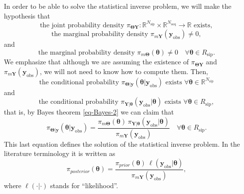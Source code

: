In order to be able to solve the statistical inverse problem, we will make the hypothesis that
\begin{equation}\label{eq-hyp-jpd}
\text{the joint probability density }\pi_{\boldsymbol{\Theta}\mathbf{Y}}:\mathbb{R}^{N_{\text{sip}}}\times\mathbb{R}^{N_{\text{soq}}}\rightarrow\mathbb{R}\text{ exists},
\end{equation}
\begin{equation}\label{eq-hyp-obs-mp}
\text{the marginal probability density }\pi_{m\mathbf{Y}}(\mathbf{y}_{\text{obs}})\neq 0,
\end{equation}
and
\begin{equation}\label{eq-hyp-theta-mp}
\text{the marginal probability density }\pi_{m\boldsymbol{\Theta}}(\boldsymbol{\theta})\neq 0\quad\forall\boldsymbol\theta\in R_{\text{sip}}.
\end{equation}
We emphasize that although we are assuming the existence of
$\pi_{\boldsymbol{\Theta}\mathbf{Y}}$ and
$\pi_{m\mathbf{Y}}(\mathbf{y}_{\text{obs}})$,
we will not need to know how to compute them.
Then,
\begin{equation*}
\text{the conditional probability }\pi_{\boldsymbol\Theta|\mathbf{y}}(\boldsymbol\theta|\mathbf{y}_{\text{obs}})\text{ exists }\forall\boldsymbol\theta\in\mathbb{R}^{N_{\text{sip}}}
\end{equation*}
and
\begin{equation*}
\text{the conditional probability }\pi_{\mathbf{Y}|\boldsymbol\theta}(\mathbf{y}_{\text{obs}}|\boldsymbol\theta)\text{ exists }\forall\boldsymbol\theta\in R_{\text{sip}},
\end{equation*}
that is, by Bayes theorem \eqref{eq-Bayes-2} we can claim that
\begin{equation*}
\pi_{\boldsymbol\Theta|\mathbf{y}}(\boldsymbol\theta|\mathbf{y}_{\text{obs}})
=
\frac
{\pi_{m\boldsymbol{\Theta}}(\boldsymbol{\theta})~\pi_{\mathbf{Y}|\boldsymbol\theta}(\mathbf{y}_{\text{obs}}|\boldsymbol\theta)}
{\pi_{m\mathbf{Y}}(\mathbf{y}_{\text{obs}})}
\quad\forall\boldsymbol\theta\in R_{\text{sip}}.
\end{equation*}
This last equation defines the solution of the statistical inverse problem. In the literature terminology it is written as
\begin{equation}\label{eq-sol-sip}
\pi_{posterior}(\boldsymbol\theta)
=
\frac
{\pi_{prior}(\boldsymbol{\theta})~\ell(\mathbf{y}_{\text{obs}}|\boldsymbol\theta)}
{\pi_{m\mathbf{Y}}(\mathbf{y}_{\text{obs}})},
\end{equation}
where $\ell(\cdot|\cdot)$ stands for ``likelihood''.
